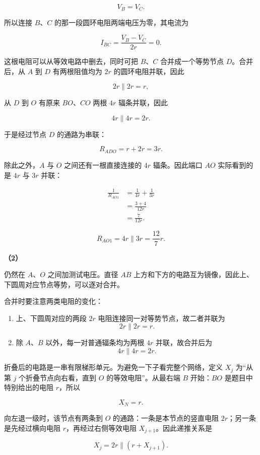 \documentclass[12pt,a4paper,UTF8]{ctexart}
\newcommand{\tightlist}{\setlength{\itemsep}{0pt}\setlength{\parskip}{0pt}}
\begin{document}
\[V_B=V_C.\]

所以连接 \(B\)、\(C\) 的那一段圆环电阻两端电压为零，其电流为

\[I_{BC}=\frac{V_B-V_C}{2r}=0.\]

这根电阻可以从等效电路中删去，同时可把 \(B\)、\(C\) 合并成一个等势节点
\(D\)。合并后，从 \(A\) 到 \(D\) 有两根阻值均为 \(2r\)
的圆环电阻并联，因此

\[2r\parallel2r=r,\]

从 \(D\) 到 \(O\) 有原来 \(BO\)、\(CO\) 两根 \(4r\) 辐条并联，因此

\[4r\parallel4r=2r.\]

于是经过节点 \(D\) 的通路为串联：

\[R_{ADO}=r+2r=3r.\]

除此之外，\(A\) 与 \(O\) 之间还有一根直接连接的 \(4r\) 辐条。因此端口
\(AO\) 实际看到的是 \(4r\) 与 \(3r\) 并联：

\[\begin{aligned}
\frac1{R_{AO1}}
&=\frac1{4r}+\frac1{3r}\\
&=\frac{3+4}{12r}\\
&=\frac7{12r}.
\end{aligned}\]

\[\boxed{R_{AO1}=4r\parallel3r=\frac{12}{7}r}.\]

\textbf{（2）}

仍然在 \(A\)、\(O\) 之间加测试电压。直径 \(AB\)
上方和下方的电路互为镜像，因此上、下圆周对应节点等势，可以逐对合并。

合并时要注意两类电阻的变化：

\begin{enumerate}
\def\labelenumi{\arabic{enumi}.}
\tightlist
\item
  上、下圆周对应的两段 \(2r\) 电阻连接同一对等势节点，故二者并联为
  \[2r\parallel2r=r.\]
\item
  除 \(A\)、\(B\) 以外，每一对普通辐条均为两根 \(4r\) 并联，故合并后为
  \[4r\parallel4r=2r.\]
\end{enumerate}

折叠后的电路是一串有限梯形单元。为避免一下子看完整个网络，定义 \(X_j\)
为``从第 \(j\) 个折叠节点向右看，直到 \(O\) 的等效电阻''。从最右端 \(B\)
开始：\(BO\) 是题目中特别给出的电阻 \(r\)，所以

\[X_N=r.\]

向左退一级时，该节点有两条到 \(O\) 的通路：一条是本节点的竖直电阻
\(2r\)；另一条是先经过横向电阻 \(r\)，再经过右侧等效电阻
\(X_{j+1}\)。因此递推关系是

\[X_j=2r\parallel(r+X_{j+1}). \tag{1}\]
\end{document}
